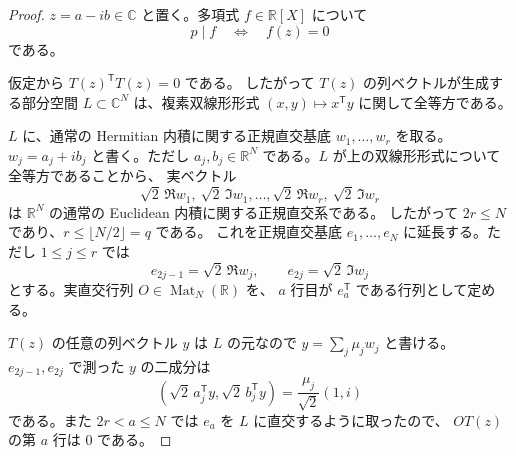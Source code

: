 \documentclass[uplatex,dvipdfmx]{jsarticle}
\newcommand{\Poly}{\mathbb{R}[X]}
\newcommand{\Mat}{\operatorname{Mat}}
\theoremstyle{matrixsosdefinition}
\begin{document}
\begin{proof}
  \(z=a-ib\in\mathbb{C}\) と置く。多項式 \(f\in\Poly\) について
  \[
    p\mid f \quad\Longleftrightarrow\quad f(z)=0
  \]
  である。

  仮定から \(T(z)^{\mathsf T}T(z)=0\) である。
  したがって \(T(z)\) の列ベクトルが生成する部分空間
  \(L\subset\mathbb{C}^{N}\) は、複素双線形形式
  \((x,y)\mapsto x^{\mathsf T}y\) に関して全等方である。

  \(L\) に、通常の Hermitian 内積に関する正規直交基底
  \(w_1,\ldots,w_r\) を取る。\(w_j=a_j+ib_j\) と書く。ただし
  \(a_j,b_j\in\mathbb{R}^{N}\) である。\(L\) が上の双線形形式について全等方であることから、
  実ベクトル
  \[
    \sqrt2\,\Re w_1,\ \sqrt2\,\Im w_1,\ldots,
    \sqrt2\,\Re w_r,\ \sqrt2\,\Im w_r
  \]
  は \(\mathbb{R}^{N}\) の通常の Euclidean 内積に関する正規直交系である。
  したがって \(2r\le N\) であり、\(r\le\lfloor N/2\rfloor=q\) である。
  これを正規直交基底 \(e_1,\ldots,e_N\) に延長する。ただし
  \(1\le j\le r\) では
  \[
    e_{2j-1}=\sqrt2\,\Re w_j,\qquad e_{2j}=\sqrt2\,\Im w_j
  \]
  とする。実直交行列 \(O\in\Mat_N(\mathbb{R})\) を、
  \(a\) 行目が \(e_a^{\mathsf T}\) である行列として定める。

  \(T(z)\) の任意の列ベクトル \(y\) は \(L\) の元なので
  \(y=\sum_j\mu_jw_j\) と書ける。
  \(e_{2j-1},e_{2j}\) で測った \(y\) の二成分は
  \[
    \left(\sqrt2\,a_j^{\mathsf T}y,\sqrt2\,b_j^{\mathsf T}y\right)
    =\frac{\mu_j}{\sqrt2}(1,i)
  \]
  である。また \(2r<a\le N\) では \(e_a\) を \(L\) に直交するように取ったので、
  \(OT(z)\) の第 \(a\) 行は \(0\) である。


\end{proof}
\end{document}
